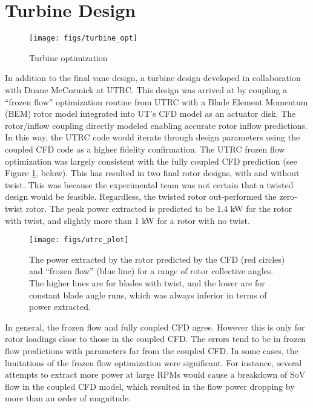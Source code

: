 \section{Turbine Design}

  \begin{figure}[!htb]
   \begin{center}
    \texttt{[image: figs/turbine\_opt]}
    \caption{Turbine optimization}
    \label{fig:ut_turbine}
   \end{center}
  \end{figure}

In addition to the final vane design, a turbine design developed in
collaboration with Duane McCormick at UTRC. This design was arrived at
by coupling a ``frozen flow'' optimization routine from UTRC with a Blade
Element Momentum (BEM) rotor model integrated into UT's CFD model as an
actuator disk. The rotor/inflow coupling directly modeled enabling
accurate rotor inflow predictions. In this way, the UTRC code would
iterate through design parameters using the coupled CFD code as a higher
fidelity confirmation. The UTRC frozen flow optimization was largely
consistent with the fully coupled CFD prediction (see Figure \ref{},
below). This has resulted in two final rotor designs, with and without
twist. This was because the experimental team was not certain that a
twisted design would be feasible. Regardless, the twisted rotor
out-performed the zero-twist rotor. The peak power extracted is
predicted to be 1.4 kW for the rotor with twist, and slightly more than
1 kW for a rotor with no twist. 

  \begin{figure}[!htb]
   \begin{center}
    \texttt{[image: figs/utrc\_plot]}
    \caption{The power extracted by the rotor predicted by the CFD (red
    circles) and ``frozen flow'' (blue line) for a range of rotor
    collective angles. The higher lines are for blades with twist, and
    the lower are for constant blade angle runs, which was always
    inferior in terms of power extracted.}
    \label{fig:UTRC_turbine}
   \end{center}
  \end{figure}


In general, the frozen flow and fully coupled CFD agree. However this is
only for rotor loadings close to those in the coupled CFD. The errors
tend to be in frozen flow predictions with parameters far from the
coupled CFD. In some cases, the limitations of the frozen flow
optimization were significant. For instance, several attempts
to extract more power at large RPMs would cause a breakdown of SoV
flow in the coupled CFD model, which resulted in the flow power dropping
by more than an order of magnitude.

